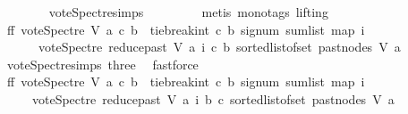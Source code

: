 \begin{isabellebody}
\ \ \ \ \ \ \isamarkupfalse%
\ vote{\isacharunderscore}{\kern0pt}Spectre{\isachardot}{\kern0pt}simps\ \isanewline
\ \ \ \ \ \ \isamarkupfalse%
\ {\isacharparenleft}{\kern0pt}metis\ {\isacharparenleft}{\kern0pt}mono{\isacharunderscore}{\kern0pt}tags{\isacharcomma}{\kern0pt}\ lifting{\isacharparenright}{\kern0pt}{\isacharparenright}{\kern0pt}\ \isanewline
\ \ \ \ \isamarkupfalse%
\ ff{}{\isacharcolon}{\kern0pt}\ {\isachardoublequoteopen}vote{\isacharunderscore}{\kern0pt}Spectre\ V\ a\ c\ b\ {\isacharequal}{\kern0pt}\ tie{\isacharunderscore}{\kern0pt}break{\isacharunderscore}{\kern0pt}int\ c\ b\ {\isacharparenleft}{\kern0pt}signum\ {\isacharparenleft}{\kern0pt}sum{\isacharunderscore}{\kern0pt}list\ {\isacharparenleft}{\kern0pt}map\ {\isacharparenleft}{\kern0pt}{\isasymlambda}i{\isachardot}{\kern0pt}\isanewline
\ \ \ \ \ \ {\isacharparenleft}{\kern0pt}vote{\isacharunderscore}{\kern0pt}Spectre\ {\isacharparenleft}{\kern0pt}reduce{\isacharunderscore}{\kern0pt}past\ V\ a{\isacharparenright}{\kern0pt}\ i\ c\ b{\isacharparenright}{\kern0pt}{\isacharparenright}{\kern0pt}\ {\isacharparenleft}{\kern0pt}sorted{\isacharunderscore}{\kern0pt}list{\isacharunderscore}{\kern0pt}of{\isacharunderscore}{\kern0pt}set\ {\isacharparenleft}{\kern0pt}past{\isacharunderscore}{\kern0pt}nodes\ V\ a{\isacharparenright}{\kern0pt}{\isacharparenright}{\kern0pt}{\isacharparenright}{\kern0pt}{\isacharparenright}{\kern0pt}{\isacharparenright}{\kern0pt}{\isachardoublequoteclose}\isanewline
\ \ \ \ \ \ \isamarkupfalse%
\ vote{\isacharunderscore}{\kern0pt}Spectre{\isachardot}{\kern0pt}simps\ three\ \isamarkupfalse%
\ fastforce\ \isanewline
\ \ \ \ \isamarkupfalse%
\ \isamarkupfalse%
\ ff{}{\isacharcolon}{\kern0pt}\ {\isachardoublequoteopen}vote{\isacharunderscore}{\kern0pt}Spectre\ V\ a\ c\ b\ {\isacharequal}{\kern0pt}\ tie{\isacharunderscore}{\kern0pt}break{\isacharunderscore}{\kern0pt}int\ c\ b\ {\isacharparenleft}{\kern0pt}signum\ {\isacharparenleft}{\kern0pt}sum{\isacharunderscore}{\kern0pt}list\ {\isacharparenleft}{\kern0pt}map\ {\isacharparenleft}{\kern0pt}{\isasymlambda}i{\isachardot}{\kern0pt}\isanewline
\ \ \ \ {\isacharparenleft}{\kern0pt}{\isacharminus}{\kern0pt}\ vote{\isacharunderscore}{\kern0pt}Spectre\ {\isacharparenleft}{\kern0pt}reduce{\isacharunderscore}{\kern0pt}past\ V\ a{\isacharparenright}{\kern0pt}\ i\ b\ c{\isacharparenright}{\kern0pt}{\isacharparenright}{\kern0pt}\ {\isacharparenleft}{\kern0pt}sorted{\isacharunderscore}{\kern0pt}list{\isacharunderscore}{\kern0pt}of{\isacharunderscore}{\kern0pt}set\ {\isacharparenleft}{\kern0pt}past{\isacharunderscore}{\kern0pt}nodes\ V\ a{\isacharparenright}{\kern0pt}{\isacharparenright}{\kern0pt}{\isacharparenright}{\kern0pt}{\isacharparenright}{\kern0pt}{\isacharparenright}{\kern0pt}{\isachardoublequoteclose}\ \isanewline

\end{isabellebody}
